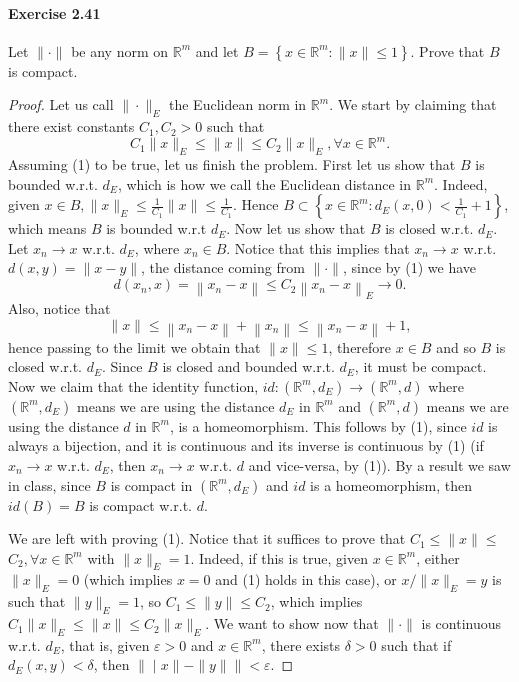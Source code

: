 \documentclass{article}
\begin{document}
\paragraph{Exercise 2.41} Let $\|\cdot\|$ be any norm on $\mathbb{R}^{m}$ and let $B=\left\{x \in \mathbb{R}^{m}:\|x\| \leq 1\right\}$. Prove that $B$ is compact.
\begin{proof}
    Let us call $\|\cdot\|_E$ the Euclidean norm in $\mathbb{R}^m$. We start by claiming that there exist constants $C_1, C_2>0$ such that
$$
C_1\|x\|_E \leq\|x\| \leq C_2\|x\|_E, \forall x \in \mathbb{R}^m .
$$
Assuming (1) to be true, let us finish the problem. First let us show that $B$ is bounded w.r.t. $d_E$, which is how we call the Euclidean distance in $\mathbb{R}^m$. Indeed, given $x \in B,\|x\|_E \leq \frac{1}{C_1}\|x\| \leq \frac{1}{C_1}$. Hence $B \subset\left\{x \in \mathbb{R}^m: d_E(x, 0)<\frac{1}{C_1}+1\right\}$, which means $B$ is bounded w.r.t $d_E$.
Now let us show that $B$ is closed w.r.t. $d_E$. Let $x_n \rightarrow x$ w.r.t. $d_E$, where $x_n \in B$. Notice that this implies that $x_n \rightarrow x$ w.r.t. $d(x, y)=\|x-y\|$, the distance coming from $\|\cdot\|$, since by (1) we have
$$
d\left(x_n, x\right)=\left\|x_n-x\right\| \leq C_2\left\|x_n-x\right\|_E \rightarrow 0 .
$$
Also, notice that
$$
\|x\| \leq\left\|x_n-x\right\|+\left\|x_n\right\| \leq\left\|x_n-x\right\|+1,
$$
hence passing to the limit we obtain that $\|x\| \leq 1$, therefore $x \in B$ and so $B$ is closed w.r.t. $d_E$. Since $B$ is closed and bounded w.r.t. $d_E$, it must be compact. Now we claim that the identity function, $i d:\left(\mathbb{R}^m, d_E\right) \rightarrow\left(\mathbb{R}^m, d\right)$ where $\left(\mathbb{R}^m, d_E\right)$ means we are using the distance $d_E$ in $\mathbb{R}^m$ and $\left(\mathbb{R}^m, d\right)$ means we are using the distance $d$ in $\mathbb{R}^m$, is a homeomorphism. This follows by (1), since $i d$ is always a bijection, and it is continuous and its inverse is continuous by (1) (if $x_n \rightarrow x$ w.r.t. $d_E$, then $x_n \rightarrow x$ w.r.t. $d$ and vice-versa, by (1)). By a result we saw in class, since $B$ is compact in $\left(\mathbb{R}^m, d_E\right)$ and $i d$ is a homeomorphism, then $i d(B)=B$ is compact w.r.t. $d$.

We are left with proving (1). Notice that it suffices to prove that $C_1 \leq\|x\| \leq$ $C_2, \forall x \in \mathbb{R}^m$ with $\|x\|_E=1$. Indeed, if this is true, given $x \in \mathbb{R}^m$, either $\|x\|_E=0$ (which implies $x=0$ and (1) holds in this case), or $x /\|x\|_E=y$ is such that $\|y\|_E=1$, so $C_1 \leq\|y\| \leq C_2$, which implies $C_1\|x\|_E \leq\|x\| \leq C_2\|x\|_E$.
We want to show now that $\|\cdot\|$ is continuous w.r.t. $d_E$, that is, given $\varepsilon>0$ and $x \in \mathbb{R}^m$, there exists $\delta>0$ such that if $d_E(x, y)<\delta$, then $\|\mid x\|-\|y\| \|<\varepsilon$.


\end{proof}
\end{document}
